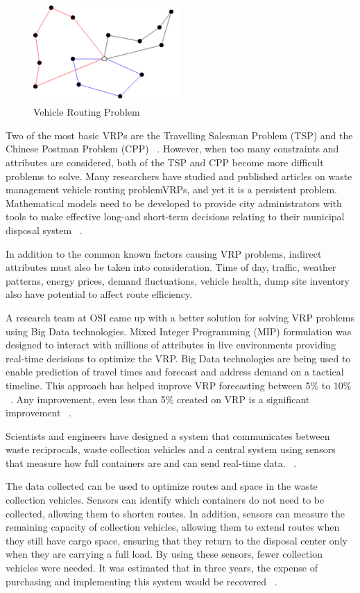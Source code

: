\documentclass[sigconf]{acmart}
\begin{document}
\begin{figure}[ht!]
  \includegraphics[width=0.5\textwidth]{vrp.png}
  \caption{Vehicle Routing Problem}
\end{figure}

Two of the most basic VRPs are the Travelling Salesman Problem (TSP) and the Chinese Postman Problem (CPP) ~\cite{belien2012}. However, when too many constraints and attributes are considered, both of the TSP and CPP become more difficult problems to solve. Many researchers have studied and published articles on waste management vehicle routing problemVRPs, and yet it is a persistent problem. Mathematical models need to be developed to provide city administrators with tools to make effective long-and short-term decisions relating to their municipal disposal system ~\cite{bhat1996}. 

In addition to the common known factors causing VRP problems, indirect attributes must also be taken into consideration.  Time of day, traffic, weather patterns, energy prices, demand fluctuations, vehicle health, dump site inventory also have potential to affect route efficiency. 

A research team at OSI came up with a better solution for solving VRP problems using Big Data technologies. Mixed Integer Programming (MIP) formulation was designed to interact with millions of attributes in live environments providing real-time decisions to optimize the VRP. Big Data technologies are being used to enable prediction of travel times and forecast and address demand on a tactical timeline. This approach has helped improve VRP forecasting between  5\% to 10\% ~\cite{vijay2013}. Any improvement, even less than 5\% created on VRP is a significant improvement ~\cite{hasle2007}.

Scientists and engineers have designed a system that communicates between waste reciprocals, waste collection vehicles and a central system using sensors that measure how full containers are and can send real-time data.  ~\cite{faccio2011}.

The data collected can be used to optimize routes and space in the waste collection vehicles.  Sensors can identify which containers do not need to be collected, allowing them to shorten routes.  In addition, sensors can measure the remaining capacity of collection vehicles, allowing them to extend routes when they still have cargo space, ensuring that they return to the disposal center only when they are carrying a full load.  By using these sensors, fewer collection vehicles were needed.  It was estimated that in three years, the expense of purchasing and implementing this system would be recovered  ~\cite{shahrokni2014big}.
\end{document}
